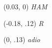 \documentclass[12pt]{article}
\begin{document}
\textblockorigin{.2in}{.2in}

\begin{textblock}{0}(0.03, 0)
	\oefamily\itshape\scriptsize HAM
\end{textblock}

\begin{textblock}{0}(-0.18, .12)
	\oefamily\itshape\Huge R
\end{textblock}

\begin{textblock}{0}(0, .13)
	\oefamily\itshape\large adio
\end{textblock}

\end{document}
